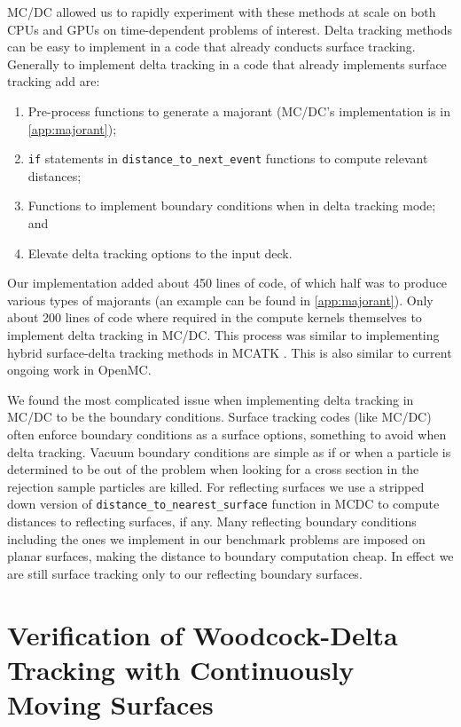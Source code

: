 MC/DC allowed us to rapidly experiment with these methods at scale on both CPUs and GPUs on time-dependent problems of interest.
Delta tracking methods can be easy to implement in a code that already conducts surface tracking. 
Generally to implement delta tracking in a code that already implements surface tracking add are:
\begin{enumerate}
    \item Pre-process functions to generate a majorant (MC/DC's implementation is in \ref{app:majorant});
    \item \texttt{if} statements in \texttt{distance\_to\_next\_event} functions to compute relevant distances;
    \item Functions to implement boundary conditions when in delta tracking mode; and
    \item Elevate delta tracking options to the input deck.
\end{enumerate}
Our implementation added about \num{450} lines of code, of which half was to produce various types of majorants (an example can be found in \ref{app:majorant}). 
Only about \num{200} lines of code where required in the compute kernels themselves to implement delta tracking in MC/DC.
This process was similar to implementing hybrid surface-delta tracking methods in MCATK \cite{morgan2023delta}.
This is also similar to current ongoing work in OpenMC.

We found the most complicated issue when implementing delta tracking in MC/DC to be the boundary conditions.
Surface tracking codes (like MC/DC) often enforce boundary conditions as a surface options, something to avoid when delta tracking.
Vacuum boundary conditions are simple as if or when a particle is determined to be out of the problem when looking for a cross section in the rejection sample particles are killed.
For reflecting surfaces we use a stripped down version of \texttt{distance\_to\_nearest\_surface} function in MCDC to compute distances to reflecting surfaces, if any.
Many reflecting boundary conditions including the ones we implement in our benchmark problems are imposed on planar surfaces, making the distance to boundary computation cheap.
In effect we are still surface tracking only to our reflecting boundary surfaces.


\section{Verification of Woodcock-Delta Tracking with Continuously Moving Surfaces}


